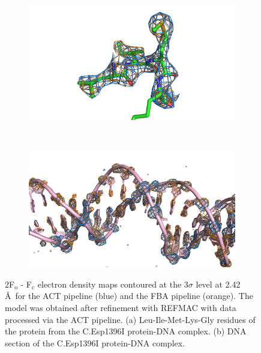\begin{figure}
    \centering
    \begin{subfigure}[b]{1.0\textwidth}
            \centering
            \includegraphics[width=\textwidth]{figures/datared/prot_section.png}
            \caption{}
            \label{fig:Electron density map 1 - C.Esp1396I}
    \end{subfigure}
    \\
    \begin{subfigure}[b]{1.0\textwidth}
            \centering
            \includegraphics[width=\textwidth]{figures/datared/DNA_section.png}
            \caption{}
            \label{fig:Electron density map 2 - C.Esp1396I}
    \end{subfigure}
    \caption[2F$_{\text{o}}$ - F$_{\text{c}}$ electron density maps for the C.Esp1396I dataset]{2F$_{\text{o}}$ - F$_{\text{c}}$ electron density maps contoured at the 3$\sigma$ level at 2.42$\,$\AA\ for the ACT pipeline (blue) and the FBA pipeline (orange).
    The model was obtained after refinement with REFMAC with data processed via the ACT pipeline.
    (a) Leu-Ile-Met-Lys-Gly residues of the protein from the C.Esp1396I protein-DNA complex.
    (b) DNA section of the C.Esp1396I protein-DNA complex.}
    \label{fig:Electron density maps - C.Esp1396I}
\end{figure}

